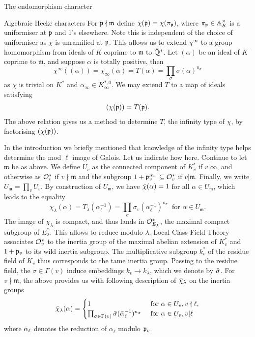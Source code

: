 \documentclass[11pt,a4paper]{article}
\newcommand{\m}{\mathfrak{m}}
\begin{document}
\begin{section}{The endomorphism character}
\begin{subsection}{Algebraic Hecke characters}
For $\mathfrak{p}\nmid \mathfrak{m}$ define $\chi(\mathfrak{p})= \chi(\pi_{\mathfrak{p}})$, where $\pi_{\mathfrak{p}} \in \mathbb{A}_K^\times$ is a uniformiser at $\mathfrak{p}$ and $1$'s elsewhere.
Note this is independent of the choice of uniformiser as $\chi$ is unramified at $\mathfrak{p}$. This allows us to extend $\chi^\infty$ to a group homomorphism from ideals of $K$ coprime to $\mathfrak{m}$ to $\Bar{\mathbb{Q}}^*$.
Let $(\alpha)$ be an ideal of $K$ coprime to $\m$, and suppose $\alpha$ is totally positive, then
$$\chi^\infty((\alpha)) = \chi_{\infty}(\alpha) = T(\alpha) = \prod_\sigma \sigma(\alpha)^{n_{\sigma}} $$
as $\chi$ is trivial on $K^*$ and $\alpha_\infty \in K_\infty^{*, 0}$. We may extend $T$ to a map of ideals satisfying $$(\chi(\mathfrak{p})) = T(\mathfrak{p}) .$$
The above relation gives us a method to determine $T$, the infinity type of $\chi$, by factorising $(\chi(\mathfrak{p}))$.

In the introduction we briefly mentioned that knowledge of the infinity type helps determine the mod $\ell$ image of Galois. Let us indicate how here.
Continue to let $\m$ be as above. We define $U_{v}$ as the connected component of $K^*_v$ if $v|\infty$, and otherwise as $\mathcal{O}^*_{v}$ if $v \nmid \m$ and  the subgroup $1 + \mathfrak{p}_v^{m_v} \subseteq \mathcal{O}^*_v$ if $v| \m$. Finally, we write $U_\m = \prod_v U_{v}$.
By construction of $U_\m$, we have $\Tilde{\chi}(\alpha)=1$ for all $\alpha \in U_\m$, which leads to the equality 
$$\chi_\lambda(\alpha) = T_\lambda(\alpha_\ell^{-1})=\prod_{\sigma}\sigma_v(\alpha_\ell^{-1})^{n_\sigma} \: \text{ for } \alpha \in U_\m. $$
The image of $\chi_\lambda$ is compact, and thus lands in $\mathcal{O}_{E_\lambda}^* $, the maximal compact subgroup of $E_\lambda^*$. This allows to reduce modulo $\lambda$.
Local Class Field Theory associates $\mathcal{O}_v^*$ to the inertia group of the maximal abelian extension of $K_v^*$ and $1+\mathfrak{p}_v$ to its wild inertia subgroup.
The multiplicative subgroup $k_v^*$ of the residue field  of $K_v$ thus corresponds to the tame inertia group. Passing to the residue field, the $\sigma \in \Gamma(v)$ induce embeddings $k_v \rightarrow k_\lambda$, which we denote by $\Bar{\sigma}$. For $v \nmid \m$, the above provides us with following description of $\Bar{\chi}_\lambda$ on the inertia groups
\begin{equation*}
\Bar{\chi}_\lambda(\alpha) = 
\begin{cases} 
1 & \text{ for } \alpha \in U_v, v\nmid \ell,\\ 
\prod_{\sigma \in \Gamma(v)} \Bar{\sigma}(\Bar{\alpha}_\ell^{-1})^{n_\sigma}  & \text{ for } \alpha \in U_v, v | \ell
\end{cases}
\end{equation*}
where $\Bar{\alpha}_\ell$ denotes the reduction of $\alpha_\ell$ modulo $\mathfrak{p}_v$.


\end{subsection}
\end{section}
\end{document}
